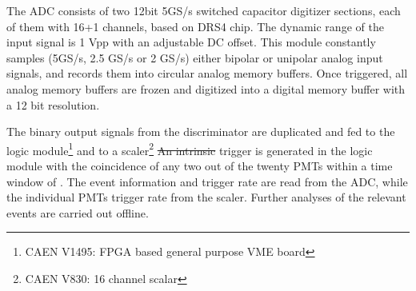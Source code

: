 

The ADC consists of two 12bit 5GS/s switched capacitor digitizer sections, 
each of them with 16+1 channels, based on DRS4 chip. The dynamic range of the input signal is 1 
Vpp with an adjustable DC offset. This module constantly samples (5GS/s, 2.5 GS/s or 2 GS/s) either bipolar or unipolar analog input 
signals, and records them into circular 
analog memory buffers. Once triggered, all analog memory 
buffers are frozen and digitized into a digital memory buffer 
with a 12 bit resolution. 

The binary output signals from the discriminator are duplicated and fed to 
the logic module\footnote{CAEN V1495: FPGA based general purpose VME board} and to a scaler\footnote{CAEN V830: 16 channel scalar} 
\sout{An intrinsic}  trigger is generated in the logic module with the coincidence of any two out of the twenty PMTs within a time window of . The event information and trigger rate are read from the ADC, while the individual PMTs trigger rate from the scaler. Further analyses of the relevant events are carried out offline.










